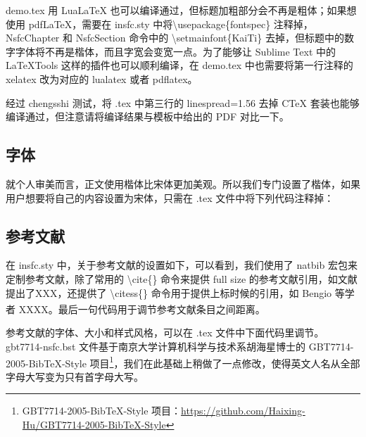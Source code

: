 \documentclass[a4paper,cs4size]{article}
\let\kaishu\relax %
\newcommand{\citess}[1]{\textsuperscript{\cite{#1}}}
\begin{document}
demo.tex 用 LuaLaTeX 也可以编译通过，但标题加粗部分会不再是粗体；如果想使用 pdfLaTeX，需要在 insfc.sty 中将\textbackslash usepackage\{fontspec\} 注释掉，NsfcChapter 和 NsfcSection 命令中的 \textbackslash setmainfont\{KaiTi\} 去掉，但标题中的数字字体将不再是楷体，而且字宽会变宽一点。为了能够让 Sublime Text 中的 LaTeXTools 这样的插件也可以顺利编译，在 demo.tex 中也需要将第一行注释的 xelatex 改为对应的 lualatex 或者 pdflatex。

经过 chengsshi 测试，将 .tex 中第三行的 linespread=1.56 去掉 CTeX 套装也能够编译通过，但注意请将编译结果与模板中给出的 PDF 对比一下。

\subsection{字体}
就个人审美而言，正文使用楷体比宋体更加美观。所以我们专门设置了楷体，如果用户想要将自己的内容设置为宋体，只需在 .tex 文件中将下列代码注释掉：


\subsection{参考文献}
在 insfc.sty 中，关于参考文献的设置如下，可以看到，我们使用了 natbib 宏包来定制参考文献，除了常用的 \textbackslash cite\{\} 命令来提供 full size 的参考文献引用，如文献\cite{li2014object}提出了XXX，还提供了 \textbackslash citess\{\} 命令用于提供上标时候的引用，如 Bengio 等学者\citess{bengio2013representation} XXXX。最后一句代码用于调节参考文献条目之间距离。


参考文献的字体、大小和样式风格，可以在 .tex 文件中下面代码里调节。gbt7714-nsfc.bst 文件基于南京大学计算机科学与技术系胡海星博士的 GBT7714-2005-BibTeX-Style 项目\footnote{GBT7714-2005-BibTeX-Style 项目：\href{https://github.com/Haixing-Hu/GBT7714-2005-BibTeX-Style}{https://github.com/Haixing-Hu/GBT7714-2005-BibTeX-Style}}，我们在此基础上稍做了一点修改，使得英文人名从全部字母大写变为只有首字母大写。
\end{document}
